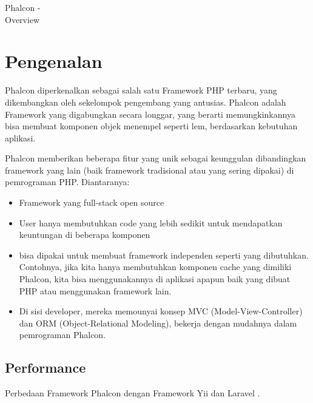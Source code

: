 {Phalcon -\\ Overview}
\section{Pengenalan}
Phalcon diperkenalkan sebagai salah satu Framework PHP terbaru, yang dikembangkan oleh sekelompok pengembang yang antusias. Phalcon adalah Framework yang digabungkan secara longgar, yang berarti memungkinkannya bisa membuat komponen objek menempel seperti lem, berdasarkan kebutuhan aplikasi.

Phalcon memberikan beberapa fitur yang unik sebagai keunggulan dibandingkan framework yang lain (baik framework tradisional atau yang sering dipakai) di pemrograman PHP. Diantaranya:

\begin{itemize}
 \item Framework yang full-stack open source

 \item User hanya membutuhkan code yang lebih sedikit untuk mendapatkan keuntungan di beberapa komponen

 \item bisa dipakai untuk membuat framework independen seperti yang dibutuhkan. Contohnya, jika kita hanya membutuhkan komponen cache yang dimiliki Phalcon, kita bisa menggunakannya di aplikasi apapun baik yang dibuat PHP atau menggunakan framework lain.

 \item Di sisi developer, mereka memounyai konsep MVC (Model-View-Controller) dan ORM (Object-Relational Modeling), bekerja dengan mudahnya dalam pemrograman Phalcon.
 \end{itemize}

\subsection{Performance}

Perbedaan Framework Phalcon dengan Framework Yii dan Laravel \cite{samra2015comparing}.

